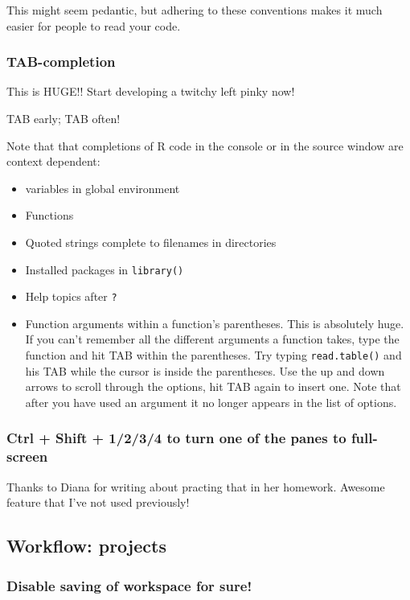 \documentclass[]{book}
\providecommand{\tightlist}{%
  \setlength{\itemsep}{0pt}\setlength{\parskip}{0pt}}
\theoremstyle{definition}
\theoremstyle{definition}
\theoremstyle{remark}
\begin{document}
This might seem pedantic, but adhering to these conventions makes it
much easier for people to read your code.

\subsubsection{TAB-completion}\label{tab-completion}

This is HUGE!! Start developing a twitchy left pinky now!

TAB early; TAB often!

Note that that completions of R code in the console or in the source
window are context dependent:

\begin{itemize}
\tightlist
\item
  variables in global environment
\item
  Functions
\item
  Quoted strings complete to filenames in directories
\item
  Installed packages in \texttt{library()}
\item
  Help topics after \texttt{?}
\item
  Function arguments within a function's parentheses. This is absolutely
  huge. If you can't remember all the different arguments a function
  takes, type the function and hit TAB within the parentheses. Try
  typing \texttt{read.table()} and his TAB while the cursor is inside
  the parentheses. Use the up and down arrows to scroll through the
  options, hit TAB again to insert one. Note that after you have used an
  argument it no longer appears in the list of options.
\end{itemize}

\subsubsection{Ctrl + Shift + 1/2/3/4 to turn one of the panes to
full-screen}\label{ctrl-shift-1234-to-turn-one-of-the-panes-to-full-screen}

Thanks to Diana for writing about practing that in her homework. Awesome
feature that I've not used previously!

\subsection{Workflow: projects}\label{workflow-projects}

\subsubsection{Disable saving of workspace for
sure!}\label{disable-saving-of-workspace-for-sure}
\end{document}
